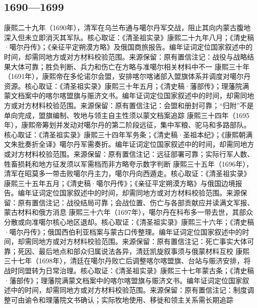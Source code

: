 \subsection{1690—1699}
康熙二十九年（1690年），清军在乌兰布通与噶尔丹军交战，阻止其向内蒙古腹地深入但未立即消灭其军队。核心取证：《清圣祖实录》康熙二十九年八月；《清史稿·噶尔丹传》；《亲征平定朔漠方略》及俄国商旅报告。编年证词定位国家叙述中的时间，却需同地方或对方材料校验范围。来源保留：原有置信注记：战役与战略结果大体可靠；胜负判断、兵力和伤亡在方略与准噶尔相关材料中不一
康熙三十年（1691年），康熙帝在多伦诺尔会盟，安排喀尔喀诸部入盟旗体系并调度对噶尔丹资源。核心取证：《清圣祖实录》康熙三十年五月；《清史稿·藩部传》；理藩院满蒙文档案中的喀尔喀盟旗与赈济文书。编年证词定位国家叙述中的时间，却需同地方或对方材料校验范围。来源保留：原有置信注记：会盟和册封可靠；“归附”不是单向完成，盟旗编制、牧地与领主自主性须以蒙文档案追踪
康熙三十四年（1695年），康熙帝筹划并发动对噶尔丹的第二阶段远征，集中军粮、驼马和多路部队。核心取证：《清圣祖实录》康熙三十四年军务条；《清史稿·圣祖本纪》；《康熙朝满文朱批奏折全译》噶尔丹军需奏折。编年证词定位国家叙述中的时间，却需同地方或对方材料校验范围。来源保留：原有置信注记：远征部署可靠；实际行军人数、牲畜损耗和地方征发须以军需档而非方略夸示数字判断
康熙三十五年（1696年），清军在昭莫多一带击败噶尔丹主力，噶尔丹向西遁走。核心取证：《清圣祖实录》康熙三十五年五月；《清史稿·噶尔丹传》；《亲征平定朔漠方略》与俄国边境报告。编年证词定位国家叙述中的时间，却需同地方或对方材料校验范围。来源保留：原有置信注记：战役结局可靠；会战位置、伤亡与各部贡献应并读满文军报、蒙古材料和俄方消息
康熙三十六年（1697年），噶尔丹在科布多一带去世，其部众分散或向准噶尔核心地区退却。核心取证：《清圣祖实录》康熙三十六年；《清史稿·噶尔丹传》；俄国西伯利亚档案与蒙古口传整理。编年证词定位国家叙述中的时间，却需同地方或对方材料校验范围。来源保留：原有置信注记：死亡事实大体可靠；死因、最后地点和部众归属说法各异，清廷凯旋叙事须与俄蒙材料互校
康熙三十七年（1698年），清廷在噶尔丹败亡后调整喀尔喀盟旗、台站与赈济安排，将战时同盟转为日常治理。核心取证：《清圣祖实录》康熙三十七年蒙古条；《清史稿·藩部传》；理藩院满蒙文档案中的喀尔喀盟旗与赈济文书。编年证词定位国家叙述中的时间，却需同地方或对方材料校验范围。来源保留：原有置信注记：制度调整可由谕令和理藩院文书确认；实际牧地使用、移徙和领主关系需长期追踪
